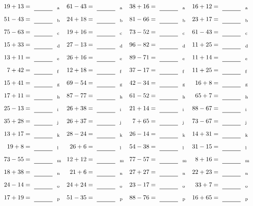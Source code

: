 \documentclass
[
  draft    = true,
  fontsize = 11pt,
  parskip  = half-
]
{scrartcl}
\begin{document}
\clearpage
\begin{align*}
    \pline{19+13}&=\rline{a}
  & \pline{61-43}&=\rline{a}
  & \pline{38+16}&=\rline{a}
  & \pline{16+12}&=\rline{a} \\[1ex]
    \pline{51-43}&=\rline{b}
  & \pline{24+18}&=\rline{b}
  & \pline{81-66}&=\rline{b}
  & \pline{23+17}&=\rline{b} \\[1ex]
    \pline{75-63}&=\rline{c}
  & \pline{19+16}&=\rline{c}
  & \pline{73-52}&=\rline{c}
  & \pline{61-43}&=\rline{c} \\[1ex]
    \pline{15+33}&=\rline{d}
  & \pline{27-13}&=\rline{d}
  & \pline{96-82}&=\rline{d}
  & \pline{11+25}&=\rline{d} \\[1ex]
    \pline{13+11}&=\rline{e}
  & \pline{26+16}&=\rline{e}
  & \pline{89-71}&=\rline{e}
  & \pline{11+14}&=\rline{e} \\[1ex]
    \pline{7+42}&=\rline{f}
  & \pline{12+18}&=\rline{f}
  & \pline{37-17}&=\rline{f}
  & \pline{11+25}&=\rline{f} \\[1ex]
    \pline{15+41}&=\rline{g}
  & \pline{69-54}&=\rline{g}
  & \pline{42-34}&=\rline{g}
  & \pline{16+8}&=\rline{g} \\[1ex]
    \pline{17+11}&=\rline{h}
  & \pline{87-77}&=\rline{h}
  & \pline{61-52}&=\rline{h}
  & \pline{65+7}&=\rline{h} \\[1ex]
    \pline{25-13}&=\rline{i}
  & \pline{26+38}&=\rline{i}
  & \pline{21+14}&=\rline{i}
  & \pline{88-67}&=\rline{i} \\[1ex]
    \pline{35+28}&=\rline{j}
  & \pline{26+37}&=\rline{j}
  & \pline{7+65}&=\rline{j}
  & \pline{73-67}&=\rline{j} \\[1ex]
    \pline{13+17}&=\rline{k}
  & \pline{28-24}&=\rline{k}
  & \pline{26-14}&=\rline{k}
  & \pline{14+31}&=\rline{k} \\[1ex]
    \pline{19+8}&=\rline{l}
  & \pline{26+6}&=\rline{l}
  & \pline{54-38}&=\rline{l}
  & \pline{31-15}&=\rline{l} \\[1ex]
    \pline{73-55}&=\rline{m}
  & \pline{12+12}&=\rline{m}
  & \pline{77-57}&=\rline{m}
  & \pline{8+16}&=\rline{m} \\[1ex]
    \pline{18+38}&=\rline{n}
  & \pline{21+6}&=\rline{n}
  & \pline{27+27}&=\rline{n}
  & \pline{22+23}&=\rline{n} \\[1ex]
    \pline{24-14}&=\rline{o}
  & \pline{24+24}&=\rline{o}
  & \pline{23-17}&=\rline{o}
  & \pline{33+7}&=\rline{o} \\[1ex]
    \pline{17+19}&=\rline{p}
  & \pline{51-35}&=\rline{p}
  & \pline{88-76}&=\rline{p}
  & \pline{16+65}&=\rline{p}
\end{align*}
\end{document}
